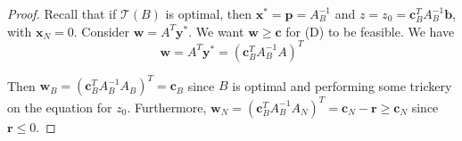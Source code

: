 \documentclass[12pt]{extarticle}
\renewcommand{\vec}[1]{\bm{#1}}
\begin{document}
\begin{proof}
	Recall that if $\mathcal T(B)$ is optimal, then $\vec x^* = \vec p = A_B^{-1}$ and
	$z = z_0 = \vec c^T_B A_B^{-1} \vec b$, with $\vec x_N = 0$.
	Consider $\vec w = A^T \vec y^*$. We want $\vec w \geq \vec c$ for (D) to be feasible.
	We have
	\begin{equation}
		\vec w = A^T \vec y^* = (\vec c^T_B A_B^{-1} A)^T
	\end{equation}

	Then $\vec w_B = (\vec c_B^T A_B^{-1}A_B)^T = \vec c_B$ since $B$ is optimal and performing some
	trickery on the equation for $z_0$.
	Furthermore, $\vec w_N  = (\vec c_B^T A_B^{-1}A_N)^T = \vec c_N - \vec r \geq \vec c_N$ since
	$\vec r \leq 0$.
\end{proof}
\end{document}
